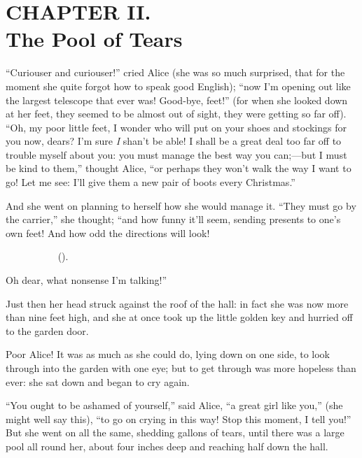 \documentclass[11pt,openany,oneside]{book}
\begin{document}

\clearpage{}
{}
\chapter*{CHAPTER II.\\  The Pool of Tears}
\leavevmode\hypertarget{d5.fp18410}{}“Curiouser and curiouser!” cried Alice (she was so much surprised, that for the moment she quite forgot how to speak good English); “now I’m opening out like the largest telescope that ever was! Good-bye, feet!” (for when she looked down at her feet, they seemed to be almost out of sight, they were getting so far off). “Oh, my poor little feet, I wonder who will put on your shoes and stockings for you now, dears? I’m sure {\em I\/} shan’t be able! I shall be a great deal too far off to trouble myself about you: you must manage the best way you can;—but I must be kind to them,” thought Alice, “or perhaps they won’t walk the way I want to go! Let me see: I’ll give them a new pair of boots every Christmas.” 

And she went on planning to herself how she would manage it. “They must go by the carrier,” she thought; “and how funny it’ll seem, sending presents to one’s own feet! And how odd the directions will look! 

{\small {\ttfamily }}{\small {}}\newline
{\small {}}\newline
{\small {}}{\small {\ttfamily ~~~~~~~~~~ (}}{\small {}}{\small {\ttfamily ). }}

Oh dear, what nonsense I’m talking!” 

Just then her head struck against the roof of the hall: in fact she was now more than nine feet high, and she at once took up the little golden key and hurried off to the garden door. 

Poor Alice! It was as much as she could do, lying down on one side, to look through into the garden with one eye; but to get through was more hopeless than ever: she sat down and began to cry again. 

“You ought to be ashamed of yourself,” said Alice, “a great girl like you,” (she might well say this), “to go on crying in this way! Stop this moment, I tell you!” But she went on all the same, shedding gallons of tears, until there was a large pool all round her, about four inches deep and reaching half down the hall. 
\end{document}
